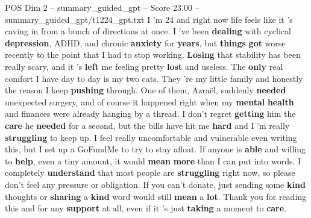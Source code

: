 \begin{textsample}{POS Dim 2 – summary\_guided\_gpt – Score 23.00 – summary\_guided\_gpt/t1224\_gpt.txt}  \label{ex:f2_pos_014}
I ’m 24 and right now life feels like it ’s caving in from a bunch of directions at once.
I ’ve been \textbf{dealing} with cyclical \textbf{depression}, ADHD, and chronic \textbf{anxiety} for \textbf{years}, but \textbf{things} \textbf{got} worse recently to the point that I had to stop working. \textbf{Losing} that stability has been really scary, and it ’s \textbf{left} me feeling pretty \textbf{lost} and useless.
The \textbf{only} real comfort I have day to day is my two cats.
They ’re my little family and honestly the reason I keep \textbf{pushing} through.
One of them, Azraël, suddenly \textbf{needed} unexpected surgery, and of course it happened right when my \textbf{mental} \textbf{health} and finances were already hanging by a thread.
I don't regret \textbf{getting} him the \textbf{care} he \textbf{needed} for a second, but the bills have hit me \textbf{hard} and I ’m really \textbf{struggling} to keep up.
I feel really uncomfortable and vulnerable even writing this, but I set up a GoFundMe to try to stay afloat.
If anyone is \textbf{able} and willing to \textbf{help}, even a tiny amount, it would \textbf{mean} \textbf{more} than I can put into words.
I completely \textbf{understand} that most people are \textbf{struggling} right now, so please don't feel any pressure or obligation.
If you can't donate, just sending some \textbf{kind} thoughts or \textbf{sharing} a \textbf{kind} word would still \textbf{mean} a \textbf{lot}.
Thank you for reading this and for any \textbf{support} at all, even if it ’s just \textbf{taking} a moment to \textbf{care}.

\end{textsample}
